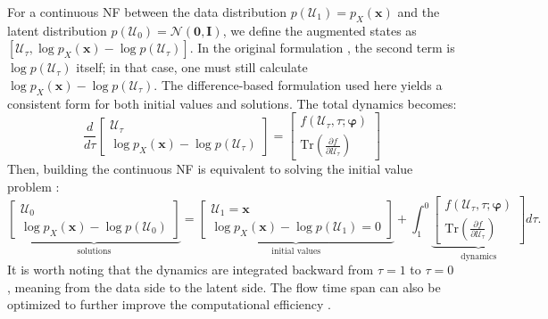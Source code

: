 For a continuous \ac{NF} between the data distribution $p(\mathcal{U}_{1})=p_X(\boldsymbol{x})$ and the latent distribution $p(\mathcal{U}_0)=\mathcal{N}(\boldsymbol{0}, \boldsymbol{I})$, we define the augmented states as $[\mathcal{U}_\tau, \log p_X(\boldsymbol{x})-\log p(\mathcal{U}_\tau)]$. In the original formulation \citep{grathwohl2018ffjord}, the second term is $\log p(\mathcal{U}_\tau)$ itself; in that case, one must still calculate $\log p_X(\boldsymbol{x})-\log p(\mathcal{U}_\tau)$. The difference-based formulation used here yields a consistent form for both initial values and solutions. The total dynamics becomes:
\begin{equation}
    \frac{d}{d\tau}\begin{bmatrix}
        \mathcal{U}_\tau \\
        \log p_X(\boldsymbol{x}) - \log p(\mathcal{U}_\tau)
        \end{bmatrix}
        =
        \begin{bmatrix}
        f(\mathcal{U}_\tau, \tau; \boldsymbol{\varphi}) \\
        \text{Tr}\left(\frac{\partial f}{\partial \mathcal{U}_\tau}\right)
        \end{bmatrix}
\end{equation}
Then, building the continuous \ac{NF} is equivalent to solving the initial value problem \citep{grathwohl2018ffjord}:
\begin{equation}
\underbrace{\begin{bmatrix}
\mathcal{U}_0 \\
\log p_X(\boldsymbol{x}) - \log p(\mathcal{U}_0)
\end{bmatrix}}_{\text{solutions}}
=
\underbrace{\begin{bmatrix}
    \mathcal{U}_1=\boldsymbol{x} \\
\log p_X(\boldsymbol{x}) - \log p(\mathcal{U}_1)=0
\end{bmatrix}}_{\text{initial values}}
+\int_{1}^{0}\underbrace{\begin{bmatrix}
f(\mathcal{U}_\tau, \tau; \boldsymbol{\varphi}) \\
\text{Tr}\left(\frac{\partial f}{\partial \mathcal{U}_\tau}\right)
\end{bmatrix}}_{\text{dynamics}}d\tau.
\end{equation}
It is worth noting that the dynamics are integrated backward from $\tau=1$ to $\tau=0$, meaning from the data side to the latent side. The flow time span can also be optimized to further improve the computational efficiency \citep{du2022toflow}.

